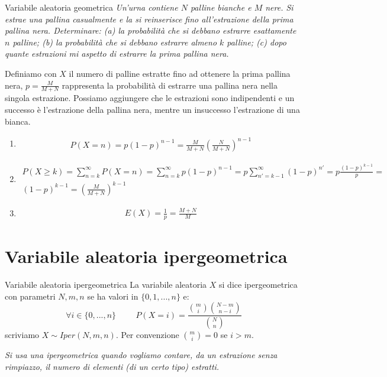\begin{Example}{Variabile aleatoria geometrica}{}
    \textit{Un'urna contiene $N$ palline bianche e $M$ nere. Si estrae una pallina casualmente e la si reinserisce fino all'estrazione della prima pallina nera. Determinare: (a) la probabilità che si debbano estrarre esattamente $n$ palline; (b) la probabilità che si debbano estrarre almeno $k$ palline; (c) dopo quante estrazioni mi aspetto di estrarre la prima pallina nera.}

    Definiamo con $X$ il numero di palline estratte fino ad ottenere la prima pallina nera, $p=\frac{M}{M+N}$ rappresenta la probabilità di estrarre una pallina nera nella singola estrazione. Possiamo aggiungere che le estrazioni sono indipendenti e un successo è l'estrazione della pallina nera, mentre un insuccesso l'estrazione di una bianca.
    \begin{enumerate}[label=(\alph*)]
        \item \begin{align*}
            P(X=n)=p(1-p)^{n-1}=\frac{M}{M+N}(\frac{N}{M+N})^{n-1}
        \end{align*}
        \item \begin{align*}
            P(X\geq k)=\sum^\infty_{n=k}P(X=n)=\sum^\infty_{n=k}p(1-p)^{n-1}=p\sum^\infty_{n'=k-1}(1-p)^{n'}=p\frac{(1-p)^{k-1}}{p}=\\(1-p)^{k-1}=(\frac{M}{M+N})^{k-1}
        \end{align*}
        \item \begin{align*}
            E(X)=\frac{1}{p}=\frac{M+N}{M}
        \end{align*}
    \end{enumerate}
\end{Example}

\section{Variabile aleatoria ipergeometrica}
\begin{Definition}{Variabile aleatoria ipergeometrica}{}
    La variabile aleatoria $X$ si dice ipergeometrica con parametri $N, m, n$ se ha valori in $\{0,1,...,n\}$ e:
    \begin{equation*}
        \forall i\in \{0,...,n\}\hspace{1cm}P(X=i)=\frac{\binom{m}{i}\binom{N-m}{n-i}}{\binom{N}{n}}
    \end{equation*}
    scriviamo $X\sim Iper(N,m,n)$. Per convenzione $\binom{m}{i}=0$ se $i>m$. 
    
    \textit{Si usa una ipergeometrica quando vogliamo contare, da un estrazione senza rimpiazzo, il numero di elementi (di un certo tipo) estratti.}
\end{Definition}

